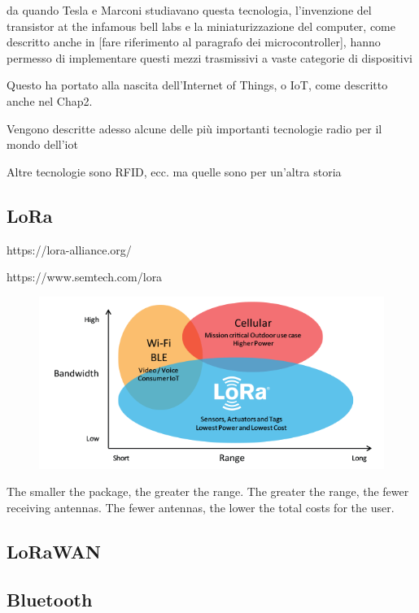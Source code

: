 	da quando Tesla e Marconi studiavano questa tecnologia, l'invenzione del transistor at the infamous bell labs e la miniaturizzazione del computer, come descritto anche in [fare riferimento al paragrafo dei microcontroller], hanno permesso di implementare questi mezzi trasmissivi a vaste categorie di dispositivi 
	
	Questo ha portato alla nascita dell'Internet of Things, o IoT, come descritto anche nel Chap2.
	
	Vengono descritte adesso alcune delle più importanti tecnologie radio per il mondo dell'iot

	Altre tecnologie sono RFID, ecc. ma quelle sono per un'altra storia
	
	\subsection{LoRa}
	
		https://lora-alliance.org/
		
		https://www.semtech.com/lora
		
		\begin{figure}
			\centering
			\includegraphics[width=\textwidth]{resources/img/LoRa_Why_Range}
			\caption{}
		\end{figure}
	
	
		The smaller the package, the greater the range.
		The greater the range, the fewer receiving antennas.
		The fewer antennas, the lower the total costs for the user.

	\subsection{LoRaWAN}
	
	\subsection{Bluetooth}		
	
